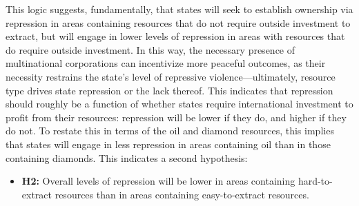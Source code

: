 This logic suggests, fundamentally, that states will seek to establish ownership via repression in areas containing resources that do not require outside investment to extract, but will engage in lower levels of repression in areas with resources that do require outside investment. In this way, the necessary presence of multinational corporations can incentivize more peaceful outcomes, as their necessity restrains the state’s level of repressive violence—ultimately, resource type drives state repression or the lack thereof. This indicates that repression should roughly be a function of whether states require international investment to profit from their resources: repression will be lower if they do, and higher if they do not. To restate this in terms of the oil and diamond resources, this implies that states will engage in less repression in areas containing oil than in those containing diamonds. This indicates a second hypothesis:

\begin{itemize}
	\item \textbf{H2:} Overall levels of repression will be lower in areas containing hard-to-extract resources than in areas containing easy-to-extract resources.
\end{itemize}

\newpage
\vspace*{25pt}
